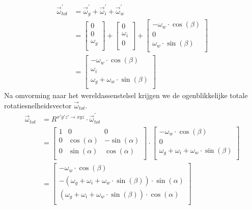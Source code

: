 \begin{equation}
\begin{split}
\vec{\omega}_{tot}^{'}&=\vec{\omega}_{g}^{'} + \vec{\omega}_{i}^{'} + \vec{\omega}_{w}^{'}\\
&=\begin{bmatrix}
0						\\
0						\\
\omega_{g}	\\
\end{bmatrix}
+\begin{bmatrix}
0						\\
\omega_{i}	\\
0						\\
\end{bmatrix}
+\begin{bmatrix}
-\omega_{w}\cdot \cos(\beta)	\\
0						\\
\omega_{w}\cdot \sin(\beta)	\\
\end{bmatrix}\\
&=\begin{bmatrix}
-\omega_{w}\cdot \cos(\beta)	\\
\omega_{i}						\\
\omega_{g}+\omega_{w}\cdot \sin(\beta)	\\
\end{bmatrix}
\end{split}
\label{eq:kin1.2}
\end{equation}
Na omvorming naar het wereldassenstelsel krijgen we de ogenblikkelijke totale rotatiesnelheidsvector $\vec{\omega}_{tot}$.
\begin{equation}
\begin{split}
\vec{\omega}_{tot}&=R^{x'y'z' \rightarrow xyz} \cdot \vec{\omega}_{tot}^{'}\\
&=\begin{bmatrix}
1			&			0			&			0		   \\
0			&\cos(\alpha)&-\sin(\alpha)\\
0			&\sin(\alpha)&\cos(\alpha) \\
\end{bmatrix}
\cdot
\begin{bmatrix}
-\omega_{w}\cdot \cos(\beta)	\\
0						\\
\omega_{g}+\omega_{i}+\omega_{w}\cdot \sin(\beta)	\\
\end{bmatrix}\\
&=
\begin{bmatrix}
-\omega_{w}\cdot \cos(\beta)	\\
-(\omega_{g}+\omega_{i}+\omega_{w}\cdot \sin(\beta))	\cdot \sin(\alpha)			\\
(\omega_{g}+\omega_{i}+\omega_{w}\cdot \sin(\beta))	\cdot \cos(\alpha)	\\
\end{bmatrix}
\end{split}
\label{eq:kin1.3}
\end{equation}
\newpage
